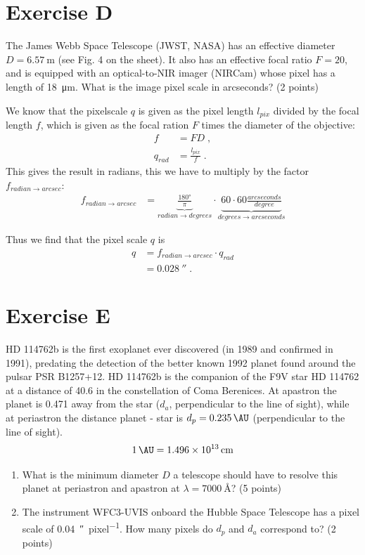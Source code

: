 \documentclass[11pt,a4paper,twoside]{article}
\begin{document}
\section*{Exercise D}
The James Webb Space Telescope (JWST, NASA) has an effective diameter
$D = \SI{6.57}{\meter}$ (see Fig. 4 on the sheet). It also has an effective 
focal ratio $F = 20$, and is equipped with an optical-to-NIR imager (NIRCam) 
whose pixel has a length of \SI{18}{\micro\meter}. What is the image pixel 
scale in arcseconds? (2 points)
\newline

We know that the pixelscale $q$ is given as the pixel length $l_{pix}$ divided 
by the focal length $f$, which is given as the focal ration $F$ times the 
diameter of the objective:
\begin{align}
    f &= FD \;, \\
    q_{rad} &= \frac{l_{pix}}{f} \;.
\end{align}
This gives the result in radians, this we have to multiply by the factor
$f_{radian \rightarrow arcsec}$:
\begin{align}
    f_{radian \rightarrow arcsec} &= 
    \underbrace{\frac{\ang{180}}{\pi}}_{radian \rightarrow degrees} \cdot 
    \underbrace{60 \cdot 60 \frac{\si{arcseconds}}{\si{degree}}}_{
                degrees \rightarrow arcseconds}
\end{align}

Thus we find that the pixel scale $q$ is
\begin{align}
    q &= f_{radian \rightarrow arcsec} \cdot q_{rad} \\
    &= \SI{0.028}{\arcsecond} \;.
\end{align}


\section*{Exercise E}
HD 114762b is the first exoplanet ever discovered (in 1989 and confirmed in
1991), predating the detection of the better known 1992 planet found around the 
pulsar PSR B1257+12. HD 114762b is the companion of the F9V star HD 114762 at 
a distance of \SI{40.6}{\parsec} in the constellation of Coma Berenices.
At apastron the planet is \SI{0.471}{\AU} away from the star ($d_a$, 
perpendicular to the line of sight), while at periastron the distance 
planet - star is $d_p = \SI{0.235}{\AU}$ (perpendicular to the  line of sight).
$$\SI{1}{\AU} = \SI{1.496d13}{\centi\meter}$$

\begin{enumerate}
\item What is the minimum diameter $D$ a telescope should have to resolve this 
planet at periastron and apastron at $\lambda = \SI{7000}{\angstrom}$? 
(5 points)
\item The instrument WFC3-UVIS onboard the Hubble Space Telescope has a pixel 
scale of \SI{0.04}{\arcsecond\per pixel}. How many pixels do $d_p$ and $d_a$ 
correspond to? (2 points)
\end{enumerate}
\end{document}
